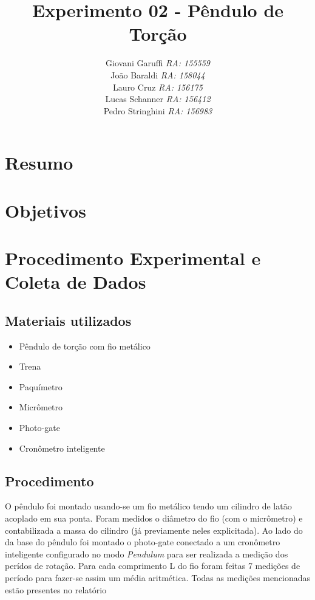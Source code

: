 \documentclass[12pt,a4paper]{article}
\begin{document}
\title{\vspace{70mm}\Huge Experimento 02 - Pêndulo de Torção}
\author{ Giovani Garuffi\qquad\hfill
		\textit {RA: 155559}\protect\\
		João Baraldi\hfill
		\textit{RA: 158044}\protect\\
		Lauro Cruz\hfill
		\textit{RA: 156175}\protect\\
		Lucas Schanner\hfill
		\textit{RA: 156412}\protect\\
		Pedro Stringhini\hfill
		\textit {RA: 156983}								
		}
\maketitle
\newpage
\section{Resumo}


\section{Objetivos}


\section{Procedimento Experimental e Coleta de Dados}

\subsection{Materiais utilizados}
\begin{itemize}
	\item Pêndulo de torção com fio metálico
	\item Trena
	\item Paquímetro
	\item Micrômetro
	\item Photo-gate
	\item Cronômetro inteligente
\end{itemize}

\subsection{Procedimento}
O pêndulo foi montado usando-se um fio metálico tendo um cilindro de latão acoplado em sua ponta. Foram medidos o diâmetro do fio (com o micrômetro) e contabilizada a massa do cilindro (já previamente neles explicitada). Ao lado do da base do pêndulo foi montado o photo-gate conectado a um cronômetro inteligente configurado no modo \emph{Pendulum} para ser realizada a medição dos perídos de rotação. Para cada comprimento L do fio foram feitas 7 medições de período para fazer-se assim um média aritmética. Todas as medições mencionadas estão presentes no relatório
\end{document}
